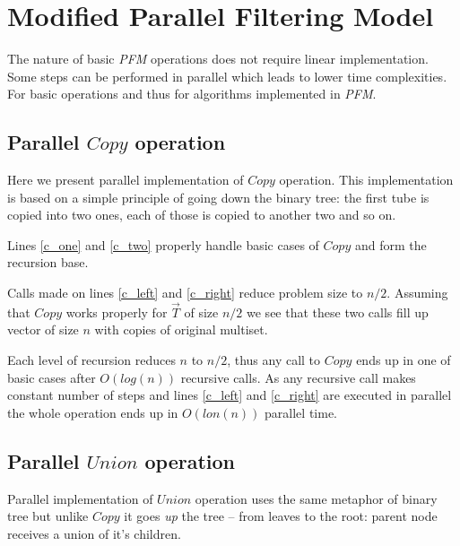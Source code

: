 \section{Modified Parallel Filtering Model}\label{mpfm}

The nature of basic \emph{PFM} operations does not require linear implementation. Some steps can be performed in parallel which leads to lower time complexities. For basic operations and thus for algorithms implemented in \emph{PFM}.

\subsection{Parallel $Copy$ operation}

Here we present parallel implementation of $Copy$ operation. This implementation is based on a simple principle of going down the binary tree: the first tube is copied into two ones, each of those is copied to another two and so on.


Lines \ref{c_one} and \ref{c_two} properly handle basic cases of $Copy$ and form the recursion base.

Calls made on lines \ref{c_left} and \ref{c_right} reduce problem size to $n/2$. Assuming that $Copy$ works properly for $\vec{T}$ of size $n/2$ we see that these two calls fill up vector of size $n$ with copies of original multiset.

Each level of recursion reduces $n$ to $n/2$, thus any call to $Copy$ ends up in one of basic cases after $O(log(n))$ recursive calls. As any recursive call makes constant number of steps and lines \ref{c_left} and \ref{c_right} are executed in parallel the whole operation ends up in $O(lon(n))$ parallel time.

\subsection{Parallel $Union$ operation}

Parallel implementation of $Union$ operation uses the same metaphor of binary tree but unlike $Copy$ it goes \emph{up} the tree -- from leaves to the root: parent node receives a union of it's children.

